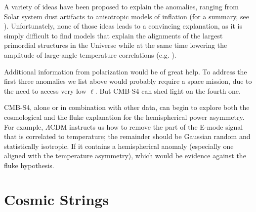 A variety of ideas have been proposed to explain the anomalies, ranging from Solar system dust artifacts to anisotropic models of inflation (for a summary, see \cite{Copi:2016hhq}). Unfortunately, none of those ideas leads to a convincing explanation, as it is simply difficult to find models that explain the alignments of the largest primordial structures in the Universe while at the same time lowering the amplitude of large-angle temperature correlations (e.g. \cite{Gordon:2005ai}). 

Additional information from polarization would be of great help. To address the first three anomalies we list above would probably require a space mission, due to the need to access very low $\ell$. But CMB-S4 can shed light on the fourth one. 

CMB-S4, alone or in combination with other data, can begin to explore both the cosmological and the fluke explanation for the hemispherical power asymmetry.  For example, $\Lambda$CDM instructs us how to remove the part of the E-mode signal that is correlated to temperature; the remainder should be Gaussian random and statistically isotropic.  If it contains a hemispherical anomaly (especially one aligned with the temperature asymmetry), which would be evidence against the fluke hypothesis.

\section{Cosmic Strings}

